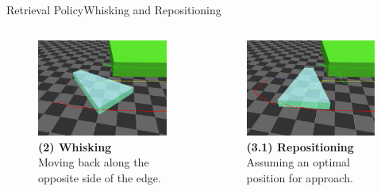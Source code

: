 \documentclass[AIRbeamer
,optEnglish
,optBiber
,optBibstyleAlphabetic
,optBeamerClassicFormat%
]{AIRlatex}
\begin{document}
    \begin{frame}[c]{Retrieval Policy}{Whisking and Repositioning}
        \begin{columns}[T,onlytextwidth]
            \begin{column}[T]{0.48\textwidth}
                \begin{figure}[H]
                    \centering
                    \includegraphics[width=\textwidth]{figures/retrieval/whisking}
                    \caption{\textbf{(2) Whisking}\\Moving back along the opposite side of the edge.}
                \end{figure}
            \end{column}
            \begin{column}[T]{0.48\textwidth}
                \begin{figure}[H]
                    \centering
                    \includegraphics[width=\textwidth]{figures/retrieval/repositioning}
                    \caption{\textbf{(3.1) Repositioning}\\Assuming an optimal position for approach.}
                \end{figure}
            \end{column}
        \end{columns}
    \end{frame}
\end{document}
